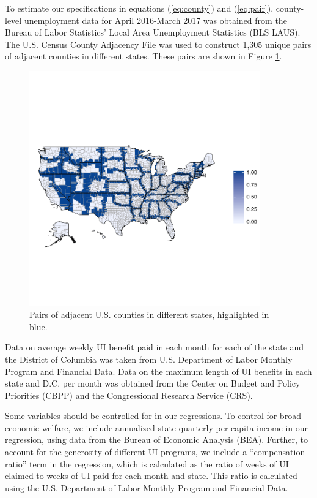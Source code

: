 \documentclass[12pt]{article}
\begin{document}
To estimate our specifications in equations (\ref{eq:county}) and (\ref{eq:pair}), county-level unemployment data for April 2016-March 2017 was obtained from the Bureau of Labor Statistics' Local Area Unemployment Statistics (BLS LAUS). The U.S. Census County Adjacency File was used to construct 1,305 unique pairs of adjacent counties in different states. These pairs are shown in Figure \ref{fig:countypair}.

\begin{figure}[ht!]
	\centering
	\includegraphics[width=100mm]{CountyPairs.pdf}
	\caption{Pairs of adjacent U.S. counties in different states, highlighted in blue. \label{fig:countypair}}
\end{figure}

Data on average weekly UI benefit paid in each month for each of the state and the District of Columbia was taken from U.S. Department of Labor Monthly Program and Financial Data. Data on the maximum length of UI benefits in each state and D.C. per month was obtained from the Center on Budget and Policy Priorities (CBPP) and the Congressional Research Service (CRS).

Some variables should be controlled for in our regressions. To control for broad economic welfare, we include annualized state quarterly per capita income in our regression, using data from the Bureau of Economic Analysis (BEA). Further, to account for the generosity of different UI programs, we include a ``compensation ratio'' term in the regression, which is calculated as the ratio of weeks of UI claimed to weeks of UI paid for each month and state. This ratio is calculated using the U.S. Department of Labor Monthly Program and Financial Data.
\end{document}
